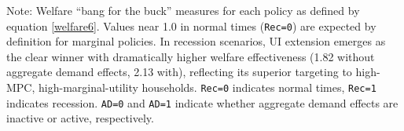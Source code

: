 \documentclass{econsocart}
\begin{document}
\begin{table}[tb] 
  \caption{\pregenmark Welfare effectiveness: policy ``bang for the buck'' comparison}
  \label{tab:welfare6}
  \centering


  \parbox{\textwidth}{
    \medskip
    \footnotesize Note: Welfare ``bang for the buck'' measures for each policy as defined by equation \eqref{welfare6}. Values near 1.0 in normal times (\texttt{Rec=0}) are expected by definition for marginal policies. In recession scenarios, UI extension emerges as the clear winner with dramatically higher welfare effectiveness (1.82 without aggregate demand effects, 2.13 with), reflecting its superior targeting to high-MPC, high-marginal-utility households. \texttt{Rec=0} indicates normal times, \texttt{Rec=1} indicates recession. \texttt{AD=0} and \texttt{AD=1} indicate whether aggregate demand effects are inactive or active, respectively.
  }

\end{table}

\vspace{0.5em}
\end{document}
